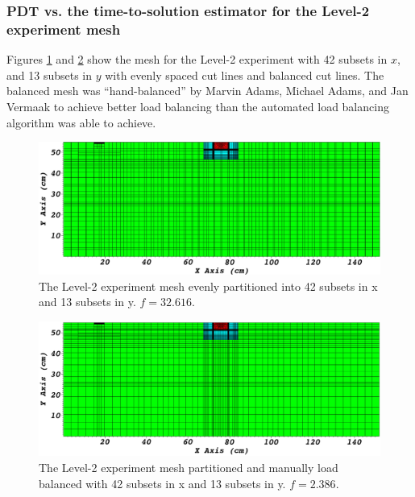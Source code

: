 \documentclass[times,final]{elsarticle}
\begin{document}
\subsubsection{PDT vs. the time-to-solution estimator for the Level-2 experiment mesh}
Figures \ref{level2_42x13} and \ref{level2_42x13_balanced} show the mesh for the Level-2 experiment with 42 subsets in $x$, and 13 subsets in $y$ with evenly spaced cut lines and balanced cut lines.
The balanced mesh was ``hand-balanced'' by Marvin Adams, Michael Adams, and Jan Vermaak to achieve better load balancing than the automated load balancing algorithm was able to achieve.
\begin{figure}[H]
\centering
\includegraphics[scale=0.28]{../figures/level2_42x13.png}
\caption{The Level-2 experiment mesh evenly partitioned into 42 subsets in x and 13 subsets in y. $f = 32.616$.}
\label{level2_42x13}
\end{figure}
\begin{figure}[H]
\centering
\includegraphics[scale=0.28]{../figures/level2_42x13_balanced.png}
\caption{The Level-2 experiment mesh partitioned and manually load balanced with 42 subsets in x and 13 subsets in y. $f = 2.386$.}
\label{level2_42x13_balanced}
\end{figure}
\end{document}
